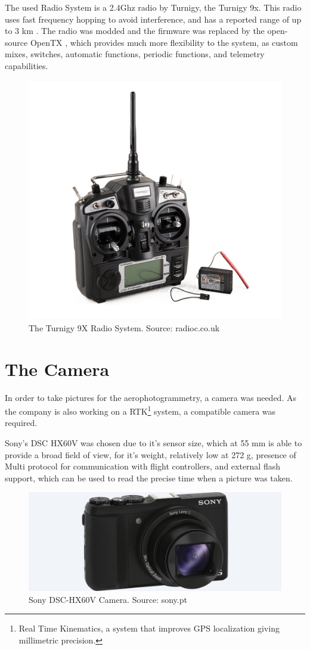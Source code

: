 The used Radio System is a 2.4Ghz radio by Turnigy, the Turnigy 9x.
%
This radio uses fast frequency hopping to avoid interference, and has a reported range of up to 3 km \cite{range9x}.
%
The radio was modded\cite{t9xmod} and the firmware was replaced by the open-source OpenTX \cite{opentx}, which provides much more flexibility to the system, as custom mixes, switches, automatic functions, periodic functions, and telemetry capabilities.

\begin{figure}[H]
\centering
  \includegraphics[width=0.8\linewidth]{figs/t9x.jpg}
  \caption{The Turnigy 9X Radio System. Source: radioc.co.uk}
  \label{fig:t9x}
\end{figure}


\section{The Camera}

In order to take pictures for the aerophotogrammetry, a camera was needed. As the company is also working on a RTK\footnote{Real Time Kinematics, a system that improves GPS localization giving millimetric precision.} system, a compatible camera was required.

Sony's DSC HX60V was chosen due to it's sensor size, which at 55 mm is able to provide a broad field of view, for it's weight, relatively low at 272 g, presence of Multi protocol for communication with flight controllers, and external flash support, which can be used to read the precise time when a picture was taken.

\begin{figure}[H]
\centering
  \includegraphics[width=0.8\linewidth]{figs/camera.jpg}
  \caption{Sony DSC-HX60V Camera. Source: sony.pt}
  \label{fig:camera}
\end{figure}


